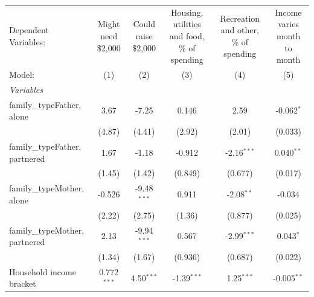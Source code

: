
\begingroup
\centering
\begin{tabular}{lccccc}
   \tabularnewline \midrule \midrule
   Dependent Variables:           & Might need \$2,000  & Could raise \$2,000  & Housing, utilities and food, \% of spending  & Recreation and other, \% of spending  & Income varies month to month\\  
   Model:                         & (1)                 & (2)                  & (3)                                          & (4)                                   & (5)\\  
   \midrule
   \emph{Variables}\\
   family\_typeFather, alone      & 3.67                & -7.25                & 0.146                                        & 2.59                                  & -0.062$^{*}$\\   
                                  & (4.87)              & (4.41)               & (2.92)                                       & (2.01)                                & (0.033)\\   
   family\_typeFather, partnered  & 1.67                & -1.18                & -0.912                                       & -2.16$^{***}$                         & 0.040$^{**}$\\   
                                  & (1.45)              & (1.42)               & (0.849)                                      & (0.677)                               & (0.017)\\   
   family\_typeMother, alone      & -0.526              & -9.48$^{***}$        & 0.911                                        & -2.08$^{**}$                          & -0.034\\   
                                  & (2.22)              & (2.75)               & (1.36)                                       & (0.877)                               & (0.025)\\   
   family\_typeMother, partnered  & 2.13                & -9.94$^{***}$        & 0.567                                        & -2.99$^{***}$                         & 0.043$^{*}$\\   
                                  & (1.34)              & (1.67)               & (0.936)                                      & (0.687)                               & (0.022)\\   
   Household income bracket       & 0.772$^{***}$       & 4.50$^{***}$         & -1.39$^{***}$                                & 1.25$^{***}$                          & -0.005$^{**}$\\   

\end{tabular}
